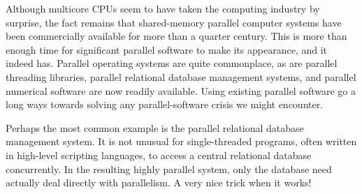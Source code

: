 Although multicore CPUs seem to have taken the computing industry
by surprise, the fact remains that shared-memory parallel computer
systems have been commercially available for more than a quarter
century.
This is more than enough time for significant parallel software
to make its appearance, and it indeed has.
Parallel operating systems are quite commonplace, as are parallel
threading libraries, parallel relational database management systems, 
and parallel numerical software are now readily available.
Using existing parallel software go a long ways towards solving any
parallel-software crisis we might encounter.

Perhaps the most common example is the parallel relational database
management system.
It is not unusual for single-threaded programs, often written in
high-level scripting languages, to access a central relational
database concurrently.
In the resulting highly parallel system, only the database need actually
deal directly with parallelism.
A very nice trick when it works!
